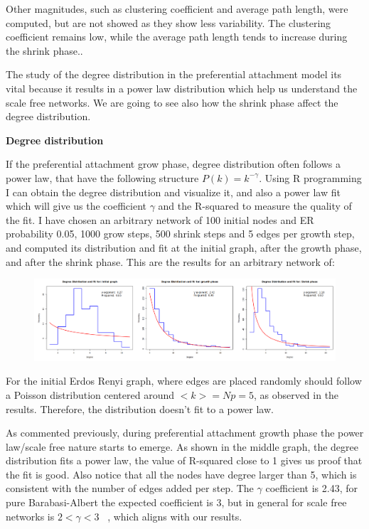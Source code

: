 Other magnitudes, such as clustering coefficient and average path length, were computed, but are not showed as they show less variability. The clustering coefficient remains low, while the average path length tends to increase during the shrink phase.. 

The study of the degree distribution in the preferential attachment model its vital because it results in a power law distribution which help us understand the scale free networks.
We are going to see also how the shrink phase affect the degree distribution. 

\textbf{Degree distribution}

If the preferential attachment grow phase, degree distribution often follows a power law, that have the following structure $P(k)=k^{-\gamma}$. Using R programming I can obtain the degree distribution and visualize it, and also a power law fit which will give us the coefficient $\gamma$ and the R-squared to measure the quality of the fit. I have chosen an arbitrary network of 100 initial nodes and ER probability 0.05, 1000 grow steps, 500 shrink steps and 5 edges per growth step, and computed its distribution and fit at the initial graph, after the growth phase, and after the shrink phase. This are the results for an arbitrary network of:

\begin{figure}[h!]
    \centering
    \includegraphics[width=1\textwidth]{images/degree_distr_pref.png}
\end{figure}

For the initial Erdos Renyi graph, where edges are placed randomly should follow a Poisson distribution centered around $<k>=Np=5$, as observed in the results. Therefore, the distribution doesn't fit to a power law.

As commented previously, during preferential attachment growth phase the power law/scale free nature starts to emerge. As shown in the middle graph, the degree distribution fits a power law, the value of R-squared close to 1 gives us proof that the fit is good. Also notice that all the nodes have degree larger than 5, which is consistent with the number of edges added per step. The $\gamma$ coefficient is 2.43, for pure Barabasi-Albert the expected coefficient is 3, but in general for scale free networks is $2<\gamma<3$ ~\cite{dedomeniconotes}, which aligns with our results.

